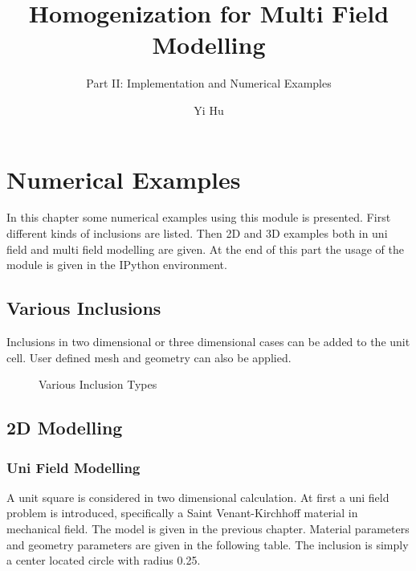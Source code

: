 \documentclass[10pt,a4paper]{scrreprt}
\author{Yi Hu}
\title{Homogenization for Multi Field Modelling}
\subtitle{Part II: Implementation and Numerical Examples}
\begin{document}
\chapter{Numerical Examples}
In this chapter some numerical examples using this module is presented. First different kinds of inclusions are listed. Then 2D and 3D examples both in uni field and multi field modelling are given. At the end of this part the usage of the module is given in the IPython environment.

\section{Various Inclusions}
Inclusions in two dimensional or three dimensional cases can be added to the unit cell. User defined mesh and geometry can also be applied.

\begin{figure}[h]
  \centering
  \caption{Various Inclusion Types}
  \label{fig: inc} %
\end{figure} 

\section{2D Modelling}
\subsection{Uni Field Modelling}
A unit square is considered in two dimensional calculation. At first a uni field problem is introduced, specifically a Saint Venant-Kirchhoff material in mechanical field. The model is given in the previous chapter. Material parameters and geometry parameters are given in the following table. The inclusion is simply a center located circle with radius 0.25. \\
\end{document}
